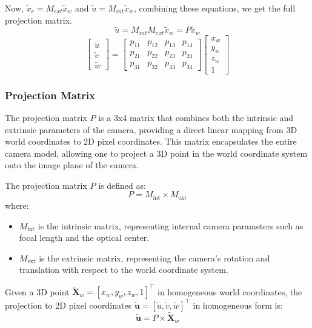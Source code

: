 Now, $\tilde{x}_c = M_{ext}\tilde{x}_w$ and  $\tilde{u} = M_{int}\tilde{x}_w$, combining these equations, we get the full projection matrix.
\[
	\tilde{u} = M_{int}M_{ext}\tilde{x}_w = P\tilde{x}_w
\]
\[
	\begin{bmatrix}
		\tilde{u} \\
		\tilde{v} \\
		\tilde{w}
	\end{bmatrix} =
	\begin{bmatrix}
		p_{11} & p_{12} & p_{13} & p_{14} \\
		p_{21} & p_{22} & p_{23} & p_{24} \\
		p_{31} & p_{32} & p_{33} & p_{34}
	\end{bmatrix}
	\begin{bmatrix}
		x_w \\
		y_w \\
		z_w \\
		1
	\end{bmatrix}
\]

\subsubsection{Projection Matrix}

The projection matrix \( P \) is a 3x4 matrix that combines both the intrinsic and extrinsic parameters of the camera, providing a direct linear mapping from 3D world coordinates to 2D pixel coordinates. This matrix encapsulates the entire camera model, allowing one to project a 3D point in the world coordinate system onto the image plane of the camera.

The projection matrix \( P \) is defined as:
\[
	P = M_{\text{int}} \times M_{\text{ext}}
\]
where:
\begin{itemize}
	\item \( M_{\text{int}} \) is the intrinsic matrix, representing internal camera parameters such as focal length and the optical center.
	\item \( M_{\text{ext}} \) is the extrinsic matrix, representing the camera's rotation and translation with respect to the world coordinate system.
\end{itemize}

Given a 3D point \( \mathbf{\tilde{X}}_w = [x_w, y_w, z_w, 1]^\top \) in homogeneous world coordinates, the projection to 2D pixel coordinates \( \mathbf{\tilde{u}} = [\tilde{u}, \tilde{v}, \tilde{w}]^\top \) in homogeneous form is:
\[
	\mathbf{\tilde{u}} = P \times \mathbf{\tilde{X}}_w
\]

